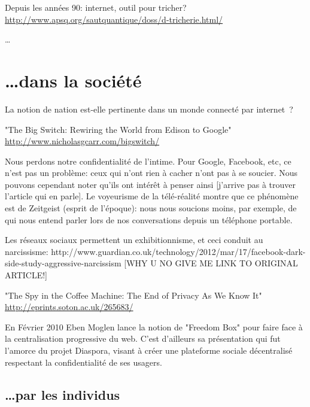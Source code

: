 Depuis les années 90: internet, outil pour tricher?
\url{http://www.apsq.org/sautquantique/doss/d-tricherie.html/}

\ldots

\section{\ldots dans la société}

La notion de nation est-elle pertinente dans un monde connecté par
internet~?

"The Big Switch: Rewiring the World from Edison to Google" 
 \url{http://www.nicholasgcarr.com/bigswitch/}

Nous perdons notre confidentialité de l'intime. Pour Google, Facebook, etc, 
ce n'est pas un problème: ceux qui n'ont rien à cacher n'ont pas à se soucier. Nous
pouvons cependant noter qu'ils ont intérêt à penser ainsi [j'arrive pas à 
trouver l'article qui en parle]. Le voyeurisme de la télé-réalité montre 
que ce phénomène est de Zeitgeist (esprit de l'époque): nous nous soucions 
moins, par exemple, de qui nous entend parler lors de nos
conversations depuis un téléphone portable.

Les réseaux sociaux permettent un exhibitionnisme, et ceci conduit au 
narcissisme:
http://www.guardian.co.uk/technology/2012/mar/17/facebook-dark-side-study-aggressive-narcissism 
[WHY U NO GIVE ME LINK TO ORIGINAL ARTICLE!]

"The Spy in the Coffee Machine: The End of Privacy As We Know It"
 \url{http://eprints.soton.ac.uk/265683/}

En Février 2010 Eben Moglen lance la notion de "Freedom Box" pour faire face à
la centralisation progressive du web. C'est d'ailleurs sa présentation qui fut
l'amorce du projet Diaspora, visant à créer une plateforme sociale décentralisé 
respectant la confidentialité de ses usagers. 

\subsection{\ldots par les individus}


